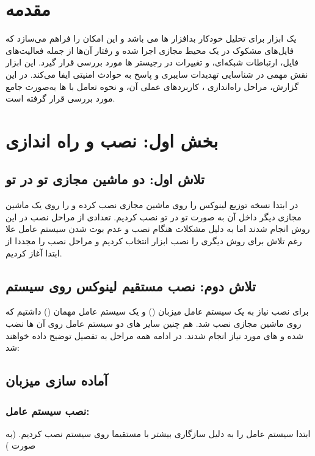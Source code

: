 \section*{مقدمه}
 یک ابزار  برای تحلیل خودکار بدافزار ها می باشد و این امکان را فراهم می‌سازد که فایل‌های مشکوک در یک محیط مجازی اجرا شده و رفتار آن‌ها از جمله فعالیت‌های فایل، ارتباطات شبکه‌ای، و تغییرات در رجیستر ها مورد بررسی قرار گیرد. این ابزار نقش مهمی در شناسایی تهدیدات سایبری و پاسخ به حوادث امنیتی ایفا می‌کند. در این گزارش، مراحل راه‌اندازی ، کاربردهای عملی آن، و نحوه تعامل با ها به‌صورت جامع مورد بررسی قرار گرفته است.
\section*{بخش اول: نصب و راه اندازی}
\subsection*{تلاش اول: دو ماشین مجازی تو در تو}
در ابتدا نسخه  توزیع  لینوکس را روی ماشین مجازی نصب کرده و  را روی یک ماشین مجازی دیگر داخل آن به صورت تو در تو نصب کردیم. تعدادی از مراحل نصب  در این روش انجام شدند اما به دلیل مشکلات هنگام نصب و عدم بوت شدن سیستم عامل علا رغم تلاش برای  روش دیگری را نصب ابزار انتخاب کردیم و مراحل نصب را مجددا از ابتدا آغاز کردیم.
\subsection*{تلاش دوم: نصب مستقیم لینوکس روی سیستم}
برای نصب  نیاز به یک سیستم عامل میزبان () و یک سیستم عامل مهمان () داشتیم که روی ماشین مجازی  نصب شد. هم چنین سایر  های دو سیستم عامل روی آن ها نضب شده و  های مورد نیاز انجام شدند. در ادامه همه مراحل به تفصیل توضیح داده خواهند شد: 
\subsection*{آماده سازی میزبان}
\subsubsection*{نصب سیستم عامل:}
ابتدا سیستم عامل  را به دلیل سازگاری بیشتر با  مستقیما روی سیستم نصب کردیم. (به صورت )

